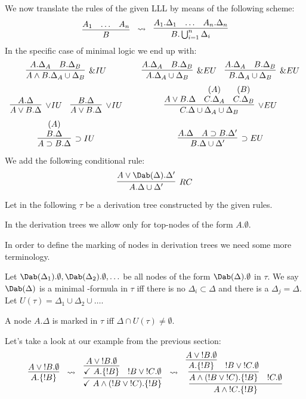 We now translate the rules of the given LLL by means of the
following scheme:
\begin{equation*}
  \vcenter{\infer{B}{A_1 & \ldots & A_n}} ~~\leadsto~~
  \vcenter{\infer{B.\bigcup_{i=1}^n \Delta_i}{A_1.\Delta_1 & \ldots &
      A_n.\Delta_n}}
\end{equation*}
In the specific case of minimal logic we end up with:
\begin{equation*}
  \begin{array}[h]{c@{~~~~~~~}c}
    \infer[\& IU]{A \wedge B.\Delta_A\cup\Delta_B}{A.\Delta_A
      & B.\Delta_B} &  %
    \infer[\& EU]{A.\Delta_A\cup\Delta_B}{A.\Delta_A & B.\Delta_B} ~~~\infer[\& EU]{B.\Delta_A\cup\Delta_B}{A.\Delta_A & B.\Delta_B} \\[.2cm]
    \infer[\vee IU]{A \vee B.\Delta}{A.\Delta} ~~~\infer[\vee IU]{A \vee B.\Delta}{B.\Delta}
    & %
    \infer[\vee EU]{C.\Delta\cup\Delta_A\cup\Delta_B}{A\vee B.\Delta & \deduce{C.\Delta_A}{(A)} &
      \deduce{C.\Delta_B}{(B)}} \\[.2cm]
    \infer[\supset IU]{A \supset B.\Delta}{\deduce{B.\Delta}{(A)}} & %
    \infer[\supset EU]{B.\Delta\cup\Delta'}{A.\Delta & A \supset B.\Delta'}   
  \end{array}
\end{equation*}
We add the following conditional rule:
\begin{equation*}
  \infer[RC]{A.\Delta\cup\Delta'}{A \vee
    \Dab(\Delta).\Delta'} 
\end{equation*}

Let in the following $\tau$ be a derivation tree constructed
by the given rules.

In the derivation trees we allow only for top-nodes of the
form $A.\emptyset$. 

In order to define the marking of nodes in derivation trees
we need some more terminology. 

Let $\Dab(\Delta_1).\emptyset, \Dab(\Delta_2).\emptyset,
\ldots$ be all nodes of the form $\Dab(\Delta).\emptyset$ in
$\tau$. We say $\Dab(\Delta)$ is a minimal \Dab-formula in
$\tau$ iff there is no $\Delta_i \subset \Delta$ and there is
a $\Delta_j = \Delta$. Let $U(\tau) = \Delta_1 \cup \Delta_2
\cup \ldots$.

\begin{defn}
  A node $A.\Delta$ is marked in $\tau$ iff $\Delta \cap
  U(\tau) \neq \emptyset$.
\end{defn}

Let's take a look at our example from the previous section:
\begin{equation*}
  \vcenter{\infer{A.\{!B\}}{A\vee {!B}.\emptyset}} ~~\leadsto~~ %
  \vcenter{\infer{\checkmark~ A\wedge (!B \vee
      {!C}).\{!B\}}{\infer{\checkmark~ A.\{!B\}}{A\vee{!B}.\emptyset} & !B
      \vee {!C}.\emptyset}} ~~\leadsto~~ %
  \vcenter{\infer{A \wedge {!C}.\{!B\}}{\infer{A\wedge (!B \vee
        {!C}).\{!B\}}{\infer{A.\{!B\}}{A\vee{!B}.\emptyset} & !B
        \vee {!C}.\emptyset} & !C.\emptyset}}
\end{equation*}

